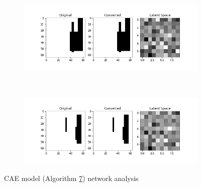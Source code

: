 \begin{figure}
    \centerfloat
    \begin{subfigure}[b]{1.25\linewidth}
        \includegraphics[width=\linewidth]{images/cae_online_lstm/caelstm_section_cae_training_block_map_10000_model_network_analysis_0.png}
    \end{subfigure}
    \\[-1.5cm]
    \begin{subfigure}[b]{1.25\linewidth}
        \includegraphics[width=\linewidth]{images/cae_online_lstm/caelstm_section_cae_training_block_map_10000_model_network_analysis_1.png}
    \end{subfigure}
    
    \caption{CAE model (Algorithm \hyperref[tab: app_evalalgorithms]{7}) network analysis}
    \label{fig: cae_7_net_analysis}
\end{figure}

